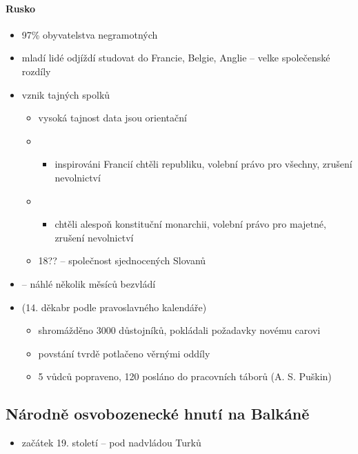 \paragraph{Rusko}
\begin{itemize}
\item 97\% obyvatelstva negramotných
\item mladí lidé odjíždí studovat do Francie, Belgie, Anglie -- velke společenské rozdíly
\item[\ra] vznik tajných spolků
	\begin{itemize}
	\item vysoká tajnost \ra data jsou orientační
	\item {}
		\begin{itemize}
		\item inspirováni Francií chtěli republiku, volební právo pro všechny, zrušení nevolnictví
		\end{itemize}
	\item {}
		\begin{itemize}
		\item chtěli alespoň konstituční monarchii, volební právo pro majetné, zrušení nevolnictví
		\end{itemize}
	\item 18?? -- společnost sjednocených Slovanů
	\end{itemize}
\item {} -- náhlé \ra několik měsíců bezvládí
\item {} (14. děkabr podle pravoslavného kalendáře)
	\begin{itemize}
	\item shromážděno 3000 důstojníků, pokládali požadavky novému carovi
	\item povstání tvrdě potlačeno věrnými oddíly
	\item 5 vůdců popraveno, 120 posláno do pracovních táborů (A. S. Puškin)
	\end{itemize}
\end{itemize}

\subsection{Národně osvobozenecké hnutí na Balkáně}
\begin{itemize}
\item začátek 19. století -- pod nadvládou Turků
\end{itemize}


